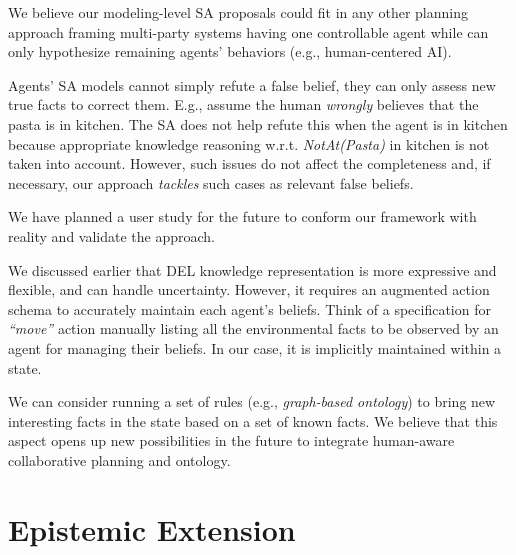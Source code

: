 We believe our modeling-level SA proposals could fit in any other planning approach framing multi-party systems having one controllable agent while can only hypothesize remaining agents' behaviors (e.g., human-centered AI).

Agents' SA models cannot simply refute a false belief, they can only assess new true facts to correct them.
E.g., assume the human \textit{wrongly} believes that the pasta is in \textsf{kitchen}. The SA does not help refute this when the agent is in \textsf{kitchen}
because appropriate knowledge reasoning w.r.t. \textit{NotAt(Pasta)} in \textsf{kitchen} is not taken into account.  
However, such issues do not affect the completeness and, if necessary, our approach \textit{tackles} such cases as relevant false beliefs.

We have planned a user study for the future to conform our framework with reality and validate the approach.

We discussed earlier that DEL knowledge representation is more expressive and flexible, and can handle uncertainty. However, it requires an augmented action schema to accurately maintain each agent's beliefs.
Think of a specification for \textit{``move''} action manually listing all the environmental facts to be observed by an agent for managing their beliefs. In our case, it is implicitly maintained within a state.

We can consider running a set of rules (e.g., \textit{graph-based ontology}) to bring new interesting facts in the state based on a set of known facts. We believe that this aspect opens up new possibilities in the future to integrate human-aware collaborative planning and ontology.

\section{Epistemic Extension}

